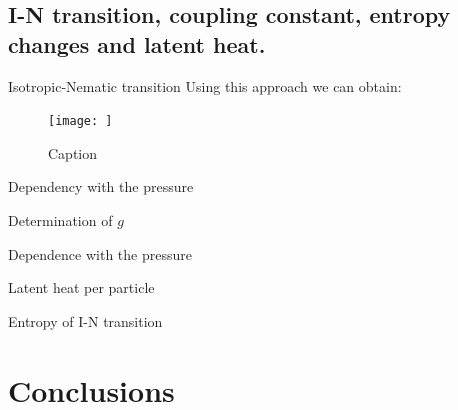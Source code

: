 \documentclass{beamer}
\begin{document}
\subsection{I-N transition, coupling constant, entropy changes and latent heat.}

\begin{frame}{Isotropic-Nematic transition}
    Using this approach we can obtain:
    \begin{figure}
        \centering
        \texttt{[image: ]}
        \caption{Caption}
        \label{fig:enter-label}
    \end{figure}
\end{frame}

\begin{frame}{Dependency with the pressure}
    
\end{frame}

\begin{frame}{Determination of $g$}
    
\end{frame}

\begin{frame}{Dependence with the pressure}
    
\end{frame}

\begin{frame}{Latent heat per particle}
    
\end{frame}

\begin{frame}{Entropy of I-N transition}
    
\end{frame}

\section{Conclusions}
\end{document}
